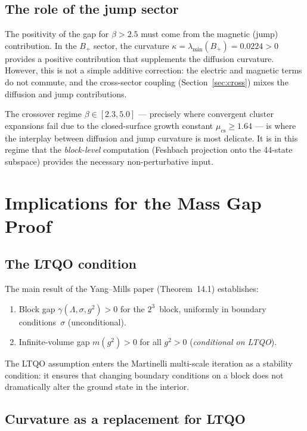 \documentclass[11pt,a4paper]{article}
\theoremstyle{plain}
\theoremstyle{definition}
\theoremstyle{remark}
\begin{document}
\subsection{The role of the jump sector}

The positivity of the gap for $\beta > 2.5$ must come from the magnetic
(jump) contribution.  In the $B_+$ sector, the curvature $\kappa =
\lambda_{\min}(B_+) = 0.0224 > 0$ provides a positive contribution
that supplements the diffusion curvature.  However, this is not a simple
additive correction: the electric and magnetic terms do not commute,
and the cross-sector coupling (Section~\ref{sec:cross}) mixes the
diffusion and jump contributions.

The crossover regime $\beta \in [2.3, 5.0]$ --- precisely where
convergent cluster expansions fail due to the closed-surface growth
constant $\mu_{\mathrm{cs}} \ge 1.64$ --- is where the interplay
between diffusion and jump curvature is most delicate.  It is in this
regime that the \emph{block-level} computation (Feshbach projection onto
the 44-state subspace) provides the necessary non-perturbative input.

\section{Implications for the Mass Gap Proof}

\subsection{The LTQO condition}

The main result of the Yang--Mills paper (Theorem~14.1) establishes:
\begin{enumerate}
\item[(i)] Block gap $\gamma(\Lambda,\sigma,g^2) > 0$ for the
  $2^3$~block, uniformly in boundary conditions~$\sigma$
  (unconditional).
\item[(ii)] Infinite-volume gap $m(g^2) > 0$ for all $g^2 > 0$
  (\emph{conditional on LTQO}).
\end{enumerate}

The LTQO assumption enters the Martinelli multi-scale iteration as a
stability condition: it ensures that changing boundary conditions on a
block does not dramatically alter the ground state in the interior.

\subsection{Curvature as a replacement for LTQO}
\end{document}
